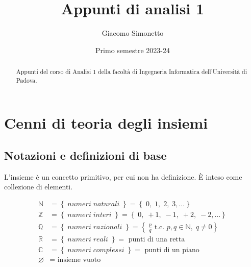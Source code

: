 \documentclass[a4paper]{article}
\title{Appunti di analisi 1}
\author{Giacomo Simonetto}
\date{Primo semestre 2023-24}
\begin{document}
\maketitle
\begin{abstract}
	Appunti del corso di Analisi 1 della facoltà di Ingegneria Informatica dell'Università di Padova.
\end{abstract}

\newpage

\tableofcontents

\newpage

\section{Cenni di teoria degli insiemi}
\subsection{Notazioni e definizioni di base}
L'insieme è un concetto primitivo, per cui non ha definizione. È inteso come collezione di elementi.

\begin{align*}
	\mathbb{N} &= \left\{ \; numeri \; naturali \; \right\} = \left\{ \; 0, \; 1, \; 2, \; 3, \dots \right\} \\
	\mathbb{Z} &= \left\{ \; numeri \; interi \; \right\} = \left\{ \; 0, \; +1, \; -1, \; +2, \; -2, \dots \right\} \\
	\mathbb{Q} &= \left\{ \; numeri \; razionali \; \right\} = \left\{ \; \frac{p}{q} \text{ t.c. } p,q \in \mathbb{N}, \; q \neq 0 \right\} \\
	\mathbb{R} &= \left\{ \; numeri \; reali \; \right\} = \text{ punti di una retta } \\
	\mathbb{C} &= \left\{ \; numeri \; complessi \; \right\} = \text{ punti di un piano } \\
	\varnothing &= \text{ insieme vuoto }
\end{align*}
\end{document}
